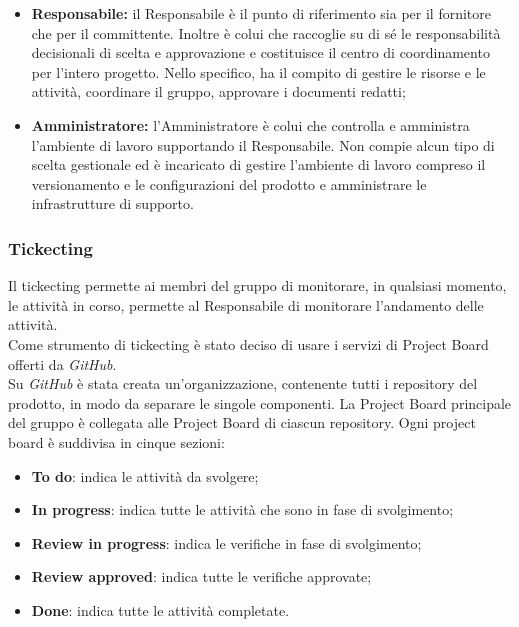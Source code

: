 \begin{itemize}
				\item \textbf{Responsabile:} il Responsabile è il punto di riferimento sia per il fornitore che per il committente. Inoltre è colui che raccoglie su di sé le responsabilità decisionali di scelta e approvazione e costituisce il centro di coordinamento per l'intero progetto. Nello specifico, ha il compito di gestire le risorse e le attività, coordinare il gruppo, approvare i documenti redatti;
				\item \textbf{Amministratore:} l'Amministratore è colui che controlla e amministra l'ambiente di lavoro supportando il Responsabile. Non compie alcun tipo di scelta gestionale ed è incaricato di gestire  l'ambiente di lavoro compreso il versionamento e le configurazioni del prodotto e amministrare le infrastrutture di supporto.
			\end{itemize}
		
		\subsubsection{Tickecting}
		Il tickecting permette ai membri del gruppo di monitorare, in qualsiasi momento, le attività in corso, permette al Responsabile di monitorare l'andamento delle attività.\\   		
		\noindent Come strumento di tickecting è stato deciso di usare i servizi di Project Board offerti da \textit{GitHub\glos}.\\   		
		Su \textit{GitHub\glo} è stata creata un'organizzazione, contenente tutti i repository del prodotto, in modo da separare le singole componenti.
		La Project Board principale del gruppo è collegata alle Project Board di ciascun repository.
		Ogni project board è suddivisa in cinque sezioni:
		\begin{itemize}
			\item \textbf{To do}: indica le attività da svolgere;
			\item \textbf{In progress}: indica tutte le attività che sono in fase di svolgimento;
			\item \textbf{Review in progress}: indica le verifiche in fase di svolgimento;
			\item \textbf{Review approved}: indica tutte le verifiche approvate;
			\item \textbf{Done}: indica tutte le attività completate.
		\end{itemize}
%   		
%   		
